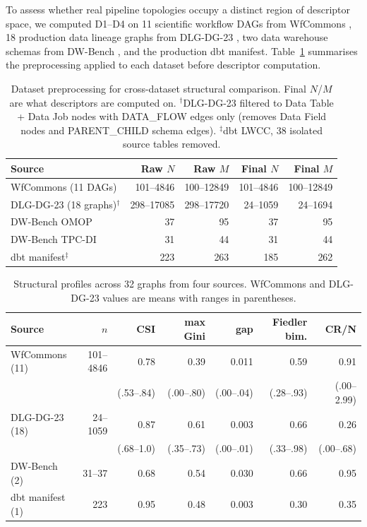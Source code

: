 \documentclass[11pt,a4paper]{article}
\begin{document}
To assess whether real pipeline topologies occupy a distinct region of
descriptor space, we computed D1--D4 on 11 scientific workflow DAGs from
WfCommons \citep{coleman2022wfcommons}, 18 production data lineage graphs
from DLG-DG-23 \citep{chen2024dlgdg}, two data warehouse schemas from
DW-Bench \citep{dwbench2025}, and the production dbt manifest.
Table~\ref{tab:preprocess} summarises the preprocessing applied to each
dataset before descriptor computation.

\begin{table}[htb]
\centering
\caption{Dataset preprocessing for cross-dataset structural comparison.
  Final $N$/$M$ are what descriptors are computed on.
  $^\dagger$DLG-DG-23 filtered to Data Table + Data Job nodes with DATA\_FLOW
  edges only (removes Data Field nodes and PARENT\_CHILD schema edges).
  $^\ddagger$dbt LWCC, 38 isolated source tables removed.}
\label{tab:preprocess}
\begin{tabular}{lrrrr}
\toprule
Source & Raw $N$ & Raw $M$ & Final $N$ & Final $M$ \\
\midrule
WfCommons (11 DAGs) & 101--4846 & 100--12849 & 101--4846 & 100--12849 \\
DLG-DG-23 (18 graphs)$^\dagger$ & 298--17085 & 298--17720 & 24--1059 & 24--1694 \\
DW-Bench OMOP & 37 & 95 & 37 & 95 \\
DW-Bench TPC-DI & 31 & 44 & 31 & 44 \\
dbt manifest$^\ddagger$ & 223 & 263 & 185 & 262 \\
\bottomrule
\end{tabular}
\end{table}

\begin{table}[htb]
\centering
\caption{Structural profiles across 32 graphs from four sources.
  WfCommons and DLG-DG-23 values are means with ranges in parentheses.}
\label{tab:crossdataset}
\begin{tabular}{lrrrrrr}
\toprule
Source & $n$ & CSI & max Gini & gap & Fiedler bim. & CR/N \\
\midrule
WfCommons (11) & 101--4846 & 0.78 & 0.39 & 0.011 & 0.59 & 0.91 \\
 & & \footnotesize{(.53--.84)} & \footnotesize{(.00--.80)} & \footnotesize{(.00--.04)} & \footnotesize{(.28--.93)} & \footnotesize{(.00--2.99)} \\
DLG-DG-23 (18) & 24--1059 & 0.87 & 0.61 & 0.003 & 0.66 & 0.26 \\
 & & \footnotesize{(.68--1.0)} & \footnotesize{(.35--.73)} & \footnotesize{(.00--.01)} & \footnotesize{(.33--.98)} & \footnotesize{(.00--.68)} \\
DW-Bench (2) & 31--37 & 0.68 & 0.54 & 0.030 & 0.66 & 0.95 \\
dbt manifest (1) & 223 & 0.95 & 0.48 & 0.003 & 0.30 & 0.35 \\
\bottomrule
\end{tabular}
\end{table}
\end{document}
